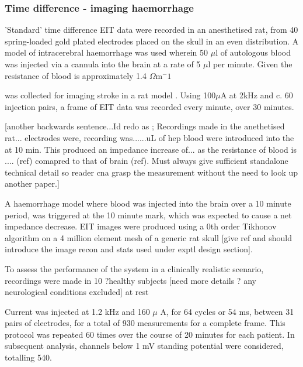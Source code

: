 \subsubsection{Time difference - imaging haemorrhage}
\label{methodsTD}
'Standard' time difference EIT data were recorded in an anesthetised rat, from 40 spring-loaded gold plated electrodes placed on the skull in an even distribution. A model of intracerebral haemorrhage was used wherein 50 $\mu$l of autologous blood was injected via a cannula into the brain at a rate of 5 $\mu$l per minute. Given the resistance of blood is approximately 1.4 $\Omega {\text{m}}^-1$




was collected for imaging stroke in a rat model \cite{Dowrick_2016}. Using 100\( \mu \)A at 2kHz and c. 60 injection pairs, a frame of EIT data was recorded every minute, over 30 minutes. 

[another backwards sentence...Id redo as ; Recordings made in the anethetised rat... electrodes were, recording was......uL of hep blood were introduced into the at 10 min. This produced an impedance increase of... as the resistance of blood is .... (ref) comapred to that of brain (ref). Must always give sufficient standalone technical detail so reader cna grasp the measurement without the need to look up another paper.]



A haemorrhage model where blood was injected into the brain over a 10 minute period, was triggered at the 10 minute mark, which was expected to cause a net impedance decrease. EIT images were produced using a 0th order Tikhonov algorithm on a 4 million element mesh of a generic rat skull [give ref and should introduce the image recon and stats used under exptl design section].

To assess the performance of the system in a clinically realistic scenario, recordings were made in 10 ?healthy subjects [need more details ? any neurological conditions excluded] at rest 



Current was injected at 1.2 kHz and 160 $\mu$ A, for 64 cycles or 54 ms, between 31 pairs of electrodes, for a total of 930 measurements for a complete frame. This protocol was repeated 60 times over the course of 20 minutes for each patient. In subsequent analysis, channels below 1 mV standing potential were considered, totalling 540. 